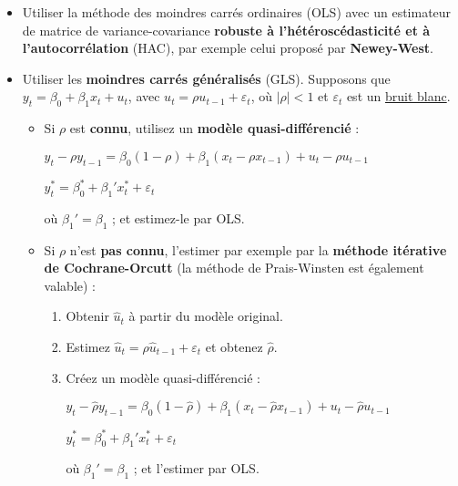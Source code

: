 \begin{f}[Correction]

\begin{itemize}[leftmargin=*]
\item Utiliser la méthode des moindres carrés ordinaires (OLS) avec un estimateur de matrice de variance-covariance \textbf{robuste à l'hétéroscédasticité et à l'autocorrélation} (HAC), par exemple celui proposé par \textbf{Newey-West}.
\item Utiliser les \textbf{moindres carrés généralisés} (GLS). Supposons que $y_{t} = \beta_{0} + \beta_{1} x_{t} + u_{t}$, avec $u_{t} = \rho u_{t - 1}+ \varepsilon_{t}$, où $\lvert \rho \rvert < 1$ et $\varepsilon_{t}$ est un \underline{bruit blanc}.

\begin{itemize}[leftmargin=*]
\item Si $\rho$ est \textbf{connu}, utilisez un \textbf{modèle quasi-différencié} :

\begin{center}
	$y_{t} - \rho y_{t - 1}= \beta_{0} (1 - \rho) + \beta_{1} (x_{t} - \rho x_{t - 1}) + u_{t} - \rho u_{t - 1}$
	
	$y_{t}^{*} = \beta_{0}^{*} + \beta_{1}' x_{t}^{*} + \varepsilon_{t}$
\end{center}

où $\beta_{1}' = \beta_{1}$ ; et estimez-le par OLS.

\item Si $\rho$ n'est \textbf{pas connu}, l'estimer par exemple par la \textbf{méthode itérative de Cochrane-Orcutt} (la méthode de Prais-Winsten est également valable) :

\begin{enumerate}[leftmargin=*]
	\item Obtenir $\hat{u}_{t}$ à partir du modèle original.
	\item Estimez $\hat{u}_{t} = \rho \hat{u}_{t-1} + \varepsilon_{t}$ et obtenez $\hat{\rho}$.
	\item Créez un modèle quasi-différencié :
	
	\begin{center}
		$y_{t} - \hat{\rho}y_{t - 1} = \beta_{0} (1 - \hat{\rho}) + \beta_{1} (x_{t} - \hat{\rho} x_{t - 1}) + u_{t} - \hat{\rho}u_{t - 1}$
		
		$y_{t}^{*} = \beta_{0}^{*} + \beta_{1}' x_{t}^{*} + \varepsilon_{t}$
	\end{center}
	
	où $\beta_{1}' = \beta_{1}$ ; et l'estimer par OLS.
	

\end{enumerate}
\end{itemize}
\end{itemize}
\end{f}
